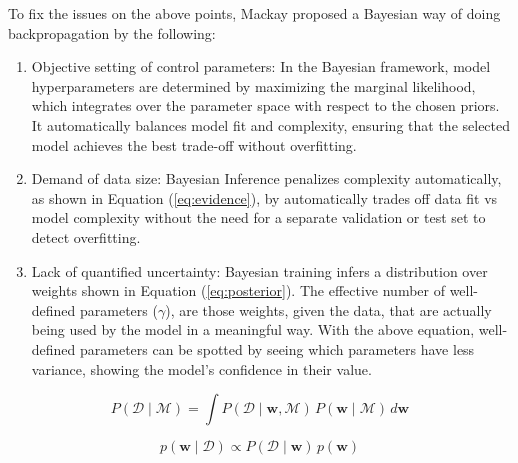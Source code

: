 \documentclass[ %
                    author={Revalda Putawara},
                supervisor={Dr. James Pope},
                    degree={MSc},
                     title={Robustness of Bayesian Neural Networks Design Choices Against Weight and Bias Perturbation Induced by Single Event Upsets (SEUs)},
                      type={},
                      year={2025}]{dissertation}
\begin{document}
To fix the issues on the above points, Mackay proposed a Bayesian way of doing backpropagation by the following:

\begin{enumerate}
\item Objective setting of control parameters: In the Bayesian framework, model hyperparameters are determined by maximizing the marginal likelihood, which integrates over the parameter space with respect to the chosen priors. It automatically balances model fit and complexity, ensuring that the selected model achieves the best trade-off without overfitting.
\item Demand of data size: Bayesian Inference penalizes complexity automatically, as shown in Equation (\ref{eq:evidence}), by automatically trades off data fit vs model complexity without the need for a separate validation or test set to detect overfitting.
\item Lack of quantified uncertainty: Bayesian training infers a distribution over weights shown in Equation (\ref{eq:posterior}).
The effective number of well-defined parameters ($\gamma$), are those weights, given the data, that are actually being used by the model in a meaningful way. With the above equation, well-defined parameters can be spotted by seeing which parameters have less variance, showing the model's confidence in their value.
\end{enumerate}

\noindent
\begin{minipage}{0.48\linewidth}
\begin{equation}
P(\mathcal{D} \mid \mathcal{M}) 
= \int P(\mathcal{D} \mid \mathbf{w}, \mathcal{M}) \,
      P(\mathbf{w} \mid \mathcal{M}) \, d\mathbf{w}
\label{eq:evidence}
\end{equation}
\end{minipage}\hfill
\begin{minipage}{0.48\linewidth}
\begin{equation}
p(\mathbf{w} \mid \mathcal{D}) \propto 
   P(\mathcal{D} \mid \mathbf{w}) \, p(\mathbf{w})
\label{eq:posterior}
\end{equation}
\end{minipage}
\end{document}
